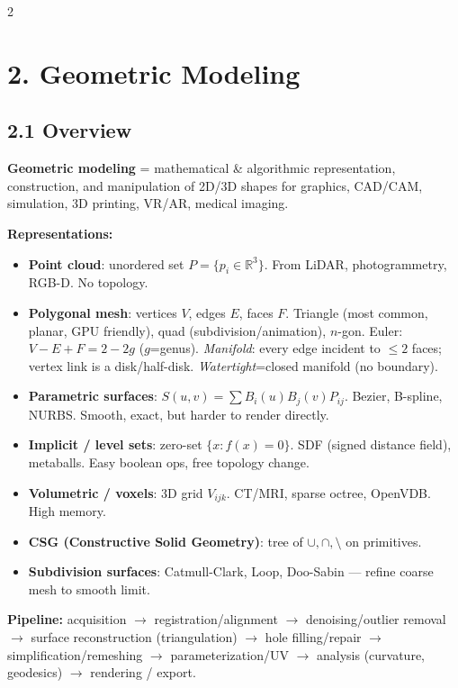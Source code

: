
\begin{paracol}{2}

\section*{2. Geometric Modeling}
\subsection*{2.1 Overview}
\textbf{Geometric modeling} = mathematical \& algorithmic representation, construction, and manipulation of 2D/3D shapes for graphics, CAD/CAM, simulation, 3D printing, VR/AR, medical imaging.

\textbf{Representations:}
\begin{itemize}[leftmargin=*,nosep]
  \item \textbf{Point cloud}: unordered set $P=\{p_i\in\mathbb{R}^3\}$. From LiDAR, photogrammetry, RGB-D. No topology.
  \item \textbf{Polygonal mesh}: vertices $V$, edges $E$, faces $F$. Triangle (most common, planar, GPU friendly), quad (subdivision/animation), $n$-gon. Euler: $V-E+F=2-2g$ ($g$=genus). \emph{Manifold}: every edge incident to $\le 2$ faces; vertex link is a disk/half-disk. \emph{Watertight}=closed manifold (no boundary).
  \item \textbf{Parametric surfaces}: $S(u,v)=\sum B_i(u)B_j(v)P_{ij}$. Bezier, B-spline, NURBS. Smooth, exact, but harder to render directly.
  \item \textbf{Implicit / level sets}: zero-set $\{x:f(x)=0\}$. SDF (signed distance field), metaballs. Easy boolean ops, free topology change.
  \item \textbf{Volumetric / voxels}: 3D grid $V_{ijk}$. CT/MRI, sparse octree, OpenVDB. High memory.
  \item \textbf{CSG (Constructive Solid Geometry)}: tree of $\cup,\cap,\setminus$ on primitives.
  \item \textbf{Subdivision surfaces}: Catmull-Clark, Loop, Doo-Sabin — refine coarse mesh to smooth limit.
\end{itemize}

\textbf{Pipeline:} acquisition $\to$ registration/alignment $\to$ denoising/outlier removal $\to$ surface reconstruction (triangulation) $\to$ hole filling/repair $\to$ simplification/remeshing $\to$ parameterization/UV $\to$ analysis (curvature, geodesics) $\to$ rendering / export.


\end{paracol}
